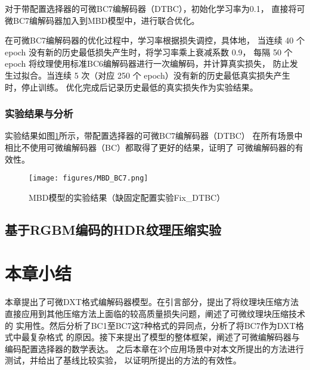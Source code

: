 对于带配置选择器的可微BC7编解码器（DTBC），初始化学习率为0.1，
直接将可微BC7编解码器加入到MBD模型中，进行联合优化。

在可微BC7编解码器的优化过程中，学习率根据损失调控，具体地，
当连续 40 个 epoch 没有新的历史最低损失产生时，将学习率乘上衰减系数 0.9，
每隔 50 个 epoch 将纹理使用标准BC6编解码器进行一次编解码，并计算真实损失，
防止发生过拟合。当连续 5 次（对应 250 个 epoch）没有新的历史最低真实损失产生时，停止训练。
优化完成后记录历史最低的真实损失作为实验结果。

\subsubsection{实验结果与分析}

实验结果如图\ref{fig:MBD_BC7}所示，带配置选择器的可微BC7编解码器（DTBC）
在所有场景中相比不使用可微编解码器（BC）都取得了更好的结果，证明了
可微编解码器的有效性。

\begin{figure}[htbp]
    \centering
    \texttt{[image: figures/MBD\_BC7.png]}
    \caption{MBD模型的实验结果（缺固定配置实验Fix\_DTBC）}
    \label{fig:MBD_BC7}
\end{figure}

\subsection{基于RGBM编码的HDR纹理压缩实验}

\section{本章小结}

本章提出了可微DXT格式编解码器模型。在引言部分，提出了将纹理块压缩方法
直接应用到其他压缩方法上面临的较高质量损失问题，阐述了可微纹理块压缩技术的
实用性。然后分析了BC1至BC7这7种格式的异同点，分析了将BC7作为DXT格式中最复杂格式
的原因。接下来提出了模型的整体框架，阐述了可微编解码器与编码配置选择器的数学表达。
之后本章在3个应用场景中对本文所提出的方法进行测试，并给出了基线比较实验，
以证明所提出的方法的有效性。


